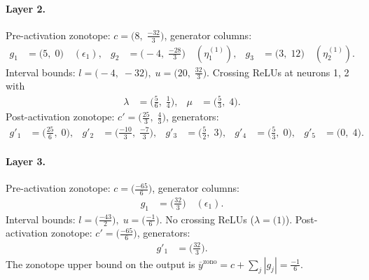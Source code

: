 \documentclass[11pt]{article}
\begin{document}
\paragraph{Layer 2.}
Pre-activation zonotope: $c = \bigl(8,\; \frac{-32}{3}\bigr)$, generator columns:
\begin{align*}
g_{1} &= \bigl(5,\; 0\bigr) \quad (\epsilon_{1}), &
g_{2} &= \bigl(-4,\; \frac{-28}{3}\bigr) \quad (\eta^{(1)}_{1}), &
g_{3} &= \bigl(3,\; 12\bigr) \quad (\eta^{(1)}_{2}).
\end{align*}
Interval bounds: $l = \bigl(-4,\; -32\bigr), \; u = \bigl(20,\; \frac{32}{3}\bigr)$. 
Crossing ReLUs at neurons 1, 2 with
\begin{align*}
\lambda &= \bigl(\frac{5}{6},\; \frac{1}{4}\bigr), & \mu &= \bigl(\frac{5}{3},\; 4\bigr).
\end{align*}
Post-activation zonotope: $c' = \bigl(\frac{25}{3},\; \frac{4}{3}\bigr)$, generators:
\begin{align*}
g'_{1} &= \bigl(\frac{25}{6},\; 0\bigr), &
g'_{2} &= \bigl(\frac{-10}{3},\; \frac{-7}{3}\bigr), &
g'_{3} &= \bigl(\frac{5}{2},\; 3\bigr), &
g'_{4} &= \bigl(\frac{5}{3},\; 0\bigr), &
g'_{5} &= \bigl(0,\; 4\bigr).
\end{align*}
\paragraph{Layer 3.}
Pre-activation zonotope: $c = \bigl(\frac{-65}{6}\bigr)$, generator columns:
\begin{align*}
g_{1} &= \bigl(\frac{32}{3}\bigr) \quad (\epsilon_{1}).
\end{align*}
Interval bounds: $l = \bigl(\frac{-43}{2}\bigr), \; u = \bigl(\frac{-1}{6}\bigr)$. 
No crossing ReLUs ($\lambda = \bigl(1\bigr)$).
Post-activation zonotope: $c' = \bigl(\frac{-65}{6}\bigr)$, generators:
\begin{align*}
g'_{1} &= \bigl(\frac{32}{3}\bigr).
\end{align*}
The zonotope upper bound on the output is $\overline{y}^{\text{zono}} = c + \sum_j |g_j| = \frac{-1}{6}$.
\end{document}
